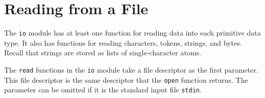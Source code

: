 \section{Reading from a File}
The \texttt{io} module has at least one function for reading data into each primitive data type.  It also has functions for reading characters, tokens, strings, and bytes.  Recall that strings are stored as lists of single-character atoms.

The \texttt{read} functions in the \texttt{io} module take a file descriptor as the first parameter.  This file descriptor is the same descriptor that the \texttt{open} function returns. The parameter can be omitted if it is the standard input file \texttt{stdin}.

